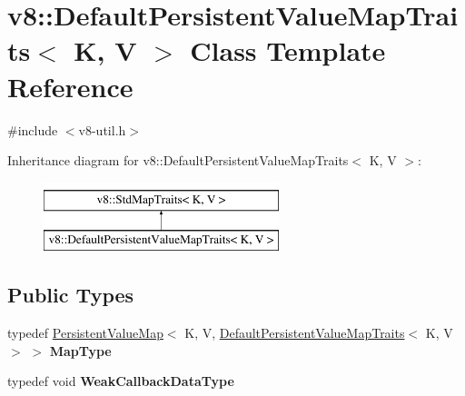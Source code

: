 \hypertarget{classv8_1_1DefaultPersistentValueMapTraits}{}\section{v8\+:\+:Default\+Persistent\+Value\+Map\+Traits$<$ K, V $>$ Class Template Reference}
\label{classv8_1_1DefaultPersistentValueMapTraits}


{\ttfamily \#include $<$v8-\/util.\+h$>$}

Inheritance diagram for v8\+:\+:Default\+Persistent\+Value\+Map\+Traits$<$ K, V $>$\+:\begin{figure}[H]
\begin{center}
\leavevmode
\includegraphics[height=2.000000cm]{classv8_1_1DefaultPersistentValueMapTraits}
\end{center}
\end{figure}
\subsection*{Public Types}
\begin{DoxyCompactItemize}
\item 
typedef \hyperlink{classv8_1_1PersistentValueMap}{Persistent\+Value\+Map}$<$ K, V, \hyperlink{classv8_1_1DefaultPersistentValueMapTraits}{Default\+Persistent\+Value\+Map\+Traits}$<$ K, V $>$ $>$ {\bfseries Map\+Type}\hypertarget{classv8_1_1DefaultPersistentValueMapTraits_a05cbd536d6bb9ba4949198351e074854}{}\label{classv8_1_1DefaultPersistentValueMapTraits_a05cbd536d6bb9ba4949198351e074854}

\item 
typedef void {\bfseries Weak\+Callback\+Data\+Type}\hypertarget{classv8_1_1DefaultPersistentValueMapTraits_a379f8c42e727a9576fb0954bb0245d8f}{}\label{classv8_1_1DefaultPersistentValueMapTraits_a379f8c42e727a9576fb0954bb0245d8f}

\end{DoxyCompactItemize}
